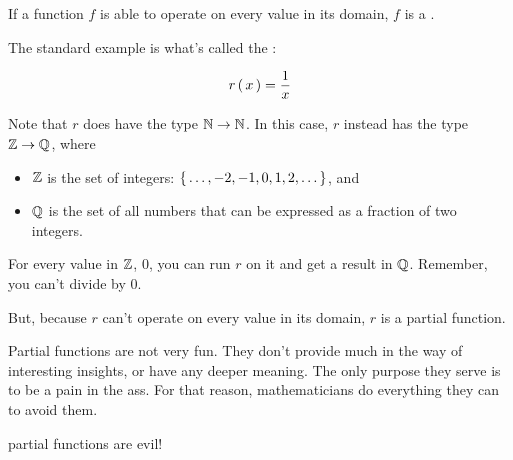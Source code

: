 \begin{definition}
    If a function $f$ is  able to operate on every value in its domain,
    $f$ is a .

    The standard example is what's called the :

    \begin{equation}
        r \left(\, x \,\right) = \frac{1}{x}
    \end{equation}

    Note that $r$ does  have the type $\mathbb{N} \to \mathbb{N}$. In this case, $r$
    instead has the type $\mathbb{Z} \to \mathbb{Q}$, where

    \begin{itemize}
      \item $\mathbb{Z}$ is the set of integers: $\left\{\, \dots,-2,-1,0,1,2,\dots \,\right\}$, and
      \item $\mathbb{Q}$ is the set of all numbers that can be expressed as a fraction
        of two integers.
    \end{itemize}

    For every value in $\mathbb{Z}$,  $0$, you can run $r$ on it and get a
    result in $\mathbb{Q}$. Remember, you can't divide by $0$.

    But, because $r$ can't operate on every value in its domain, $r$ is a
    partial function.

    Partial functions are not very fun. They don't provide much in the way of
    interesting insights, or have any deeper meaning. The only purpose they
    serve is to be a pain in the ass. For that reason, mathematicians do
    everything they can to avoid them.

     partial functions are evil!
\end{definition}

